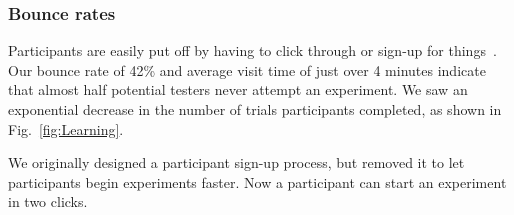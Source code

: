 %


\subsubsection{Bounce rates}
Participants are easily put off by having to click through or sign-up for things~\cite{krug2009don}.  Our bounce rate of 42\% and average visit time of just over 4 minutes indicate that almost half potential testers never attempt an experiment. We saw an exponential decrease in the number of trials participants completed, as shown in Fig.~\ref{fig:Learning}.

We originally designed a participant sign-up process, but removed it to let participants begin experiments faster. Now a participant can start an experiment in two clicks.


